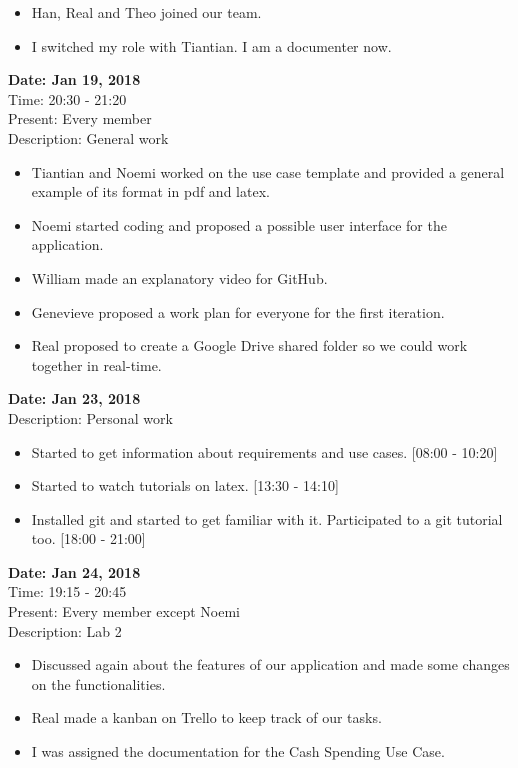 \documentclass[12pt]{article}
\begin{document}
\begin{flushleft}
\begin{itemize}

\item Han, Real and Theo joined our team.
\item I switched my role with Tiantian. I am a documenter now. 
\end{itemize}

\textbf{Date: Jan 19, 2018} \\
Time: 20:30 - 21:20 \\
Present: Every member \\
Description: General work  \\

\begin{itemize}

\item Tiantian and Noemi worked on the use case template and provided a general example of its format in pdf and latex.
\item Noemi started coding and proposed a possible user interface for the application. 
\item William made an explanatory video for GitHub.
\item Genevieve proposed a work plan for everyone for the first iteration.
\item Real proposed to create a Google Drive shared folder so we could work together in real-time. 
\end{itemize}


\textbf{Date: Jan 23, 2018} \\
Description: Personal work  \\
\begin{itemize}
\item  Started to get information about requirements and use cases. [08:00 - 10:20]
\item  Started to watch tutorials on latex. [13:30 - 14:10]
\item  Installed git and started to get familiar with it. Participated to a git tutorial too. [18:00 - 21:00] 
\end{itemize}


\textbf{Date: Jan 24, 2018} \\
Time: 19:15 - 20:45 \\
Present: Every member except Noemi \\
Description: Lab 2  \\

\begin{itemize}
\item Discussed again about the features of our application and made some changes on the functionalities. 
\item Real made a kanban on Trello to keep track of our tasks. 
\item I was assigned the documentation for the Cash Spending Use Case.
\end{itemize}



\end{flushleft}
\end{document}

